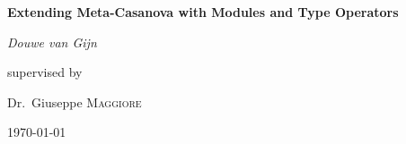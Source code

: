 \documentclass[12pt,a4paper]{report}
\begin{document}
\begin{titlepage}
	\centering
	       {\Huge\bfseries Extending Meta-Casanova with Modules and Type Operators\par}
	\vspace{2cm}
	{\Large\itshape Douwe van Gijn\par}
	\vfill
	supervised by\par
	Dr.~Giuseppe \textsc{Maggiore}
	\vfill
	{\large \today\par}
\end{titlepage}
\end{document}

